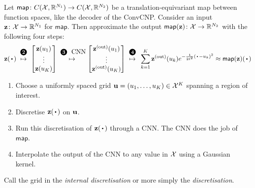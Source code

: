 \documentclass[12pt]{report}
\begin{document}
\begin{procedure}[Discretisation]
    \label{proc:discretisation}
    Let $\mathsf{map}\colon C(\mathcal{X}, \mathbb{R}^{N_1}) \to C(\mathcal{X}, \mathbb{R}^{N_2})$ be a translation-equivariant map between function spaces,
    like the decoder of the ConvCNP.
    Consider an input $\mathbf{z}\colon \mathcal{X} \to \mathbb{R}^{N_1}$ for $\mathsf{map}$. 
    Then approximate the output $\mathsf{map}(\mathbf{z}) \colon \mathcal{X} \to \mathbb{R}^{N_2}$ with the following four steps:
    \begin{equation*}
        \vz(\vardot)
        \overset{\raisebox{5pt}{\ballnumber{2}}}{\mapsto}
        \begin{bmatrix}
            \vz(u_1) \\
            \vdots \\
            \vz(u_K) 
        \end{bmatrix}
        \overset{\raisebox{5pt}{\ballnumber{3} \text{\normalshape CNN}}}{\mapsto}
        \begin{bmatrix}
            \vz\us{(out)}(u_1) \\
            \vdots \\
            \vz\us{(out)}(u_K) 
        \end{bmatrix}
        \overset{\raisebox{5pt}{\ballnumber{4}}}{\mapsto}
            \vphantom{
                \begin{bmatrix}
                    \vz \\ \vdots \\ \vz
                \end{bmatrix}
            }
            \sum_{k=1}^K \vz\us{(out)}(u_k) e^{-\frac{1}{2\ell^2}(\vardot - u_k)^2}
        \approx
        \mathsf{map}(\vz)(\vardot)
    \end{equation*}
    \begin{enumerate}
        \item[\ballnumber{1}]
            Choose a uniformly spaced grid $\mathbf{u} = (u_1, \ldots, u_K) \in \mathcal{X}^K$ spanning a region of interest.
        \item[\ballnumber{2}]
            Discretise $\vz(\vardot)$ on $\mathbf{u}$.
        \item[\ballnumber{3}]
            Run this discretisation of $\vz(\vardot)$ through a CNN.
            The CNN does the job of $\mathsf{map}$.
        \item[\ballnumber{4}]
            Interpolate the output of the CNN to any value in $\mathcal{X}$ using a Gaussian kernel.
    \end{enumerate}
    Call the grid in  the \emph{internal discretisation} or more simply the \emph{discretisation}.
\end{procedure}
\end{document}
